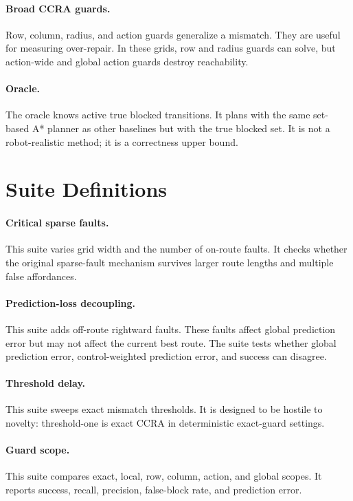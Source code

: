 \documentclass{article}
\begin{document}
\paragraph{Broad CCRA guards.}
Row, column, radius, and action guards generalize a mismatch. They are useful for measuring over-repair. In these grids, row and radius guards can solve, but action-wide and global action guards destroy reachability.

\paragraph{Oracle.}
The oracle knows active true blocked transitions. It plans with the same set-based A* planner as other baselines but with the true blocked set. It is not a robot-realistic method; it is a correctness upper bound.

\section{Suite Definitions}

\paragraph{Critical sparse faults.}
This suite varies grid width and the number of on-route faults. It checks whether the original sparse-fault mechanism survives larger route lengths and multiple false affordances.

\paragraph{Prediction-loss decoupling.}
This suite adds off-route rightward faults. These faults affect global prediction error but may not affect the current best route. The suite tests whether global prediction error, control-weighted prediction error, and success can disagree.

\paragraph{Threshold delay.}
This suite sweeps exact mismatch thresholds. It is designed to be hostile to novelty: threshold-one is exact CCRA in deterministic exact-guard settings.

\paragraph{Guard scope.}
This suite compares exact, local, row, column, action, and global scopes. It reports success, recall, precision, false-block rate, and prediction error.
\end{document}
